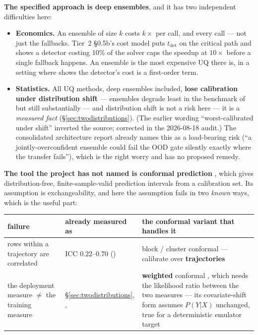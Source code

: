 \textbf{The specified approach is deep ensembles}, and it has two independent
difficulties here:

\begin{itemize}
\item \textbf{Economics.} An ensemble of size $k$ costs $k\times$ per call, and
  every call --- not just the fallbacks. Tier~2 \S 0.5b's cost model puts
  $t_{\mathrm{det}}$ on the critical path and shows a detector costing 10\% of
  the solver caps the speedup at $10\times$ before a single fallback happens.
  An ensemble is the most expensive UQ there is, in a setting where
   shows the detector's cost is a first-order term.
\item \textbf{Statistics.} All UQ methods, deep ensembles
  \citep{lakshminarayanan2017} included, \textbf{lose calibration under
  distribution shift} --- ensembles degrade least in the benchmark of
  \citet{ovadia2019} but still substantially --- and distribution shift is not
  a risk here --- it is a \emph{measured fact} (\S\ref{sec:twodistributions}).
  (The earlier wording ``worst-calibrated under shift'' inverted the source;
  corrected in the 2026-08-18 audit.) The consolidated architecture report
  already names this as a load-bearing risk (``a jointly-overconfident ensemble
  could fail the OOD gate silently exactly where the transfer fails''), which
  is the right worry and has no proposed remedy.
\end{itemize}

\textbf{The tool the project has not named is conformal prediction}
\citep{vovk2005, angelopoulos2021}, which gives distribution-free,
finite-sample-valid prediction intervals from a calibration set. Its assumption
is exchangeability, and here the assumption fails in two \emph{known} ways,
which is the useful part:

\begingroup
\small
\begin{tabularx}{\textwidth}{@{}L{3.6cm} L{3.4cm} Y@{}}
\toprule
\textbf{failure} & \textbf{already measured as} & \textbf{the conformal variant that handles it} \\
\midrule
rows within a trajectory are correlated &
  ICC 0.22--0.70 () &
  block / cluster conformal --- calibrate over \textbf{trajectories}
   \\
the deployment measure $\ne$ the training measure &
  \S\ref{sec:twodistributions}, ,  &
  \textbf{weighted} conformal \citep{tibshirani2019}, which needs the
  likelihood ratio between the two measures --- its covariate-shift form
  assumes $P(Y|X)$ unchanged, true for a deterministic emulator target \\
\bottomrule
\end{tabularx}
\endgroup

